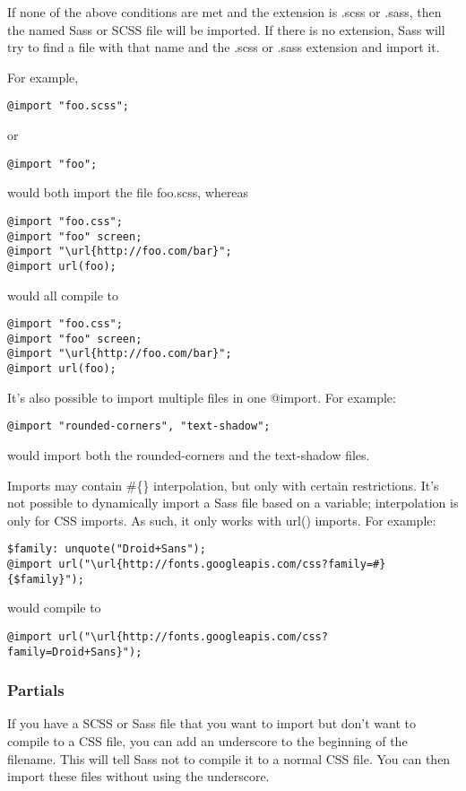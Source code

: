\documentclass[10pt]{article}
\begin{document}
 If none of the above conditions are met and the extension is .scss or .sass, then the named Sass or SCSS file will be imported. If there is no extension, Sass will try to find a file with that name and the .scss or .sass extension and import it.


 For example,
\begin{verbatim}
@import "foo.scss";
\end{verbatim}


 or
\begin{verbatim}
@import "foo";
\end{verbatim}


 would both import the file foo.scss, whereas
\begin{verbatim}
@import "foo.css";
@import "foo" screen;
@import "\url{http://foo.com/bar}";
@import url(foo);
\end{verbatim}


 would all compile to
\begin{verbatim}
@import "foo.css";
@import "foo" screen;
@import "\url{http://foo.com/bar}";
@import url(foo);
\end{verbatim}


 It’s also possible to import multiple files in one @import. For example:
\begin{verbatim}
@import "rounded-corners", "text-shadow";
\end{verbatim}


 would import both the rounded-corners and the text-shadow files.


 Imports may contain \#\{\} interpolation, but only with certain restrictions. It’s not possible to dynamically import a Sass file based on a variable; interpolation is only for CSS imports. As such, it only works with url() imports. For example:
\begin{verbatim}
$family: unquote("Droid+Sans");
@import url("\url{http://fonts.googleapis.com/css?family=#}{$family}");
\end{verbatim}


 would compile to
\begin{verbatim}
@import url("\url{http://fonts.googleapis.com/css?family=Droid+Sans}");
\end{verbatim}
\subsubsection{Partials}


 If you have a SCSS or Sass file that you want to import but don’t want to compile to a CSS file, you can add an underscore to the beginning of the filename. This will tell Sass not to compile it to a normal CSS file. You can then import these files without using the underscore.
\end{document}
